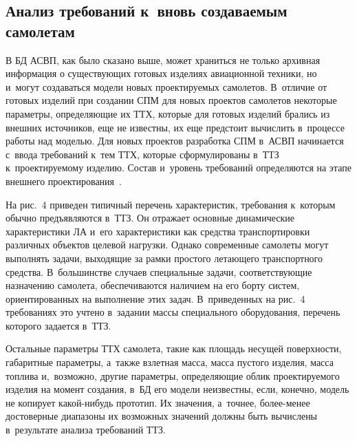 \begin{multicols}{2}
  
\section{Анализ требований к~вновь создаваемым самолетам}

  В БД АСВП, как было сказано выше, может храниться не только архивная 
информация о существующих готовых изделиях авиационной техники, но 
и~могут создаваться модели новых про\-ек\-ти\-ру\-емых самолетов. В~отличие от 
готовых изделий при создании СПМ для новых проектов самолетов некоторые 
параметры, опре\-де\-ля\-ющие их ТТХ, которые для готовых изделий брались из 
внеш\-них источников, еще не известны, их еще предстоит вы\-чис\-лить в~процессе 
работы над моделью. Для новых проектов разработка СПМ в~\mbox{АСВП} начинается 
с~ввода требований к~тем ТТХ, 
которые сформулированы в~ТТЗ к~про\-ек\-ти\-ру\-емо\-му изделию. Состав и~уровень 
требований определяются на этапе внеш\-не\-го проектирования~\cite{2-fl}.
  
  На рис.~4 приведен типичный перечень характеристик, требования 
к~которым обычно предъявляются в~ТТЗ. Он отражает основные динамические 
характеристики ЛА и~его характеристики как средства транспортировки 
различных объектов целевой на\-груз\-ки. Однако современные самолеты могут 
выполнять задачи, выходящие за рамки простого ле\-та\-юще\-го транспортного 
средства. В~большинстве случаев специальные задачи, соответствующие 
назначению самолета, обеспечиваются наличием на его борту сис\-тем, 
ориентированных на выполнение этих задач. В~приведенных на рис.~4 
требованиях это учтено в~задании массы специального оборудования, перечень 
которого задается в~ТТЗ.
  


  Остальные параметры ТТХ самолета, такие как площадь несущей 
по\-верх\-ности, габаритные па\-ра\-мет\-ры, а~также взлетная масса, масса пус\-то\-го 
изделия, масса топлива и,~воз\-мож\-но, другие па\-ра\-мет\-ры, опре\-де\-ля\-ющие облик 
проектируемого изделия на момент создания, в~БД его модели неизвестны, если, 
конечно, модель не копирует какой-нибудь прототип. Их значения, а~точнее, 
бо\-лее-ме\-нее до\-сто\-вер\-ные диапазоны их возможных значений должны быть 
вы\-чис\-ле\-ны в~результате анализа требований ТТЗ.

\setcounter{figure}{4}
\begin{figure*} %
\vspace*{1pt}
 \begin{center}  
    \mbox{%
\epsfxsize=110mm 
}
\end{center}
\vspace*{-9pt}
\end{figure*}
  

\end{multicols}
